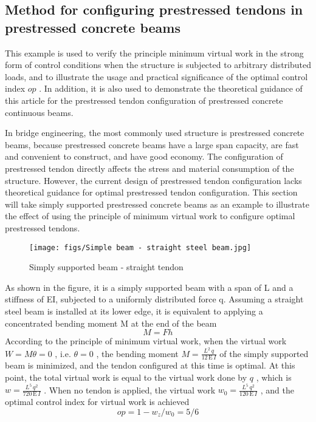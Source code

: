 \subsection {Method for configuring prestressed tendons in prestressed concrete beams}
This example is used to verify the principle minimum virtual work in the strong form of control conditions when the structure is subjected to arbitrary distributed loads, and to illustrate the usage and practical significance of the optimal control index $ op $ . In addition, it is also used to demonstrate the theoretical guidance of this article for the prestressed tendon configuration of prestressed concrete continuous beams.

In bridge engineering, the most commonly used structure is prestressed concrete beams, because prestressed concrete beams have a large span capacity, are fast and convenient to construct, and have good economy. The configuration of prestressed tendon directly affects the stress and material consumption of the structure. However, the current design of prestressed tendon configuration lacks theoretical guidance for optimal prestressed tendon configuration. This section will take simply supported prestressed concrete beams as an example to illustrate the effect of using the principle of minimum virtual work to configure optimal prestressed tendons.
\begin{figure}[h!] %
    \centering
    \texttt{[image: figs/Simple beam - straight steel beam.jpg]} 
    \caption{Simply supported beam - straight tendon}
    \label{fig:number}
\end{figure}

As shown in the figure, it is a simply supported beam with a span of L and a stiffness of EI, subjected to a uniformly distributed force q. Assuming a straight steel beam is installed at its lower edge, it is equivalent to applying a concentrated bending moment M at the end of the beam
\begin{equation}\label{eq:(example.yyl.23)}
M=F h
\end{equation}
According to the principle of minimum virtual work, when the virtual work $ W=M \theta=0 $ , i.e. $ \theta=0 $ , the bending moment $ M=\frac {L ^ 2 \, q} {12 \, \textrm {E} \, I}$  of the simply supported beam is minimized, and the tendon configured at this time is optimal.
At this point, the total virtual work is equal to the virtual work done by $ q $ , which is $ w=\frac {L ^ 5 \, q ^ 2} {720 \, \textrm {E} \, I}$  . When no tendon is applied, the virtual work $ w_0=\frac {L ^ 5 \, q ^ 2} {120 \, \textrm {E} \, I}$  , and the optimal control index for virtual work is achieved
\begin{equation}\label{eq:(example.yyl.23)}
op=1-w_z/w_0=5/6
\end{equation}

